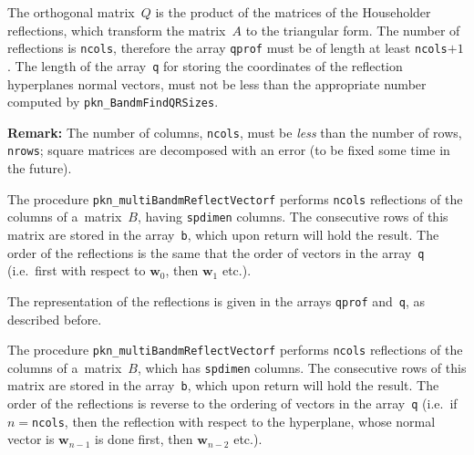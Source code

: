 The orthogonal matrix~$Q$ is the product of the matrices of the Householder
reflections, which transform the matrix~$A$ to the triangular form.
The number of reflections is \texttt{ncols}, therefore the array
\texttt{qprof} must be of length at least \texttt{ncols}$+1$. The length
of the array~\texttt{q} for storing the coordinates of the reflection
hyperplanes normal vectors, must not be less than the appropriate number
computed by \texttt{pkn\_BandmFindQRSizes}.

\vspace{\medskipamount}
\noindent
\textbf{Remark:} The number of columns, \texttt{ncols}, must be \emph{less}
than the number of rows, \texttt{nrows}; square matrices are decomposed
with an error (to be fixed some time in the future).

\vspace{\bigskipamount}
The procedure \texttt{pkn\_multiBandmReflectVectorf} performs \texttt{ncols}
reflections of the columns of a~matrix~$B$, having \texttt{spdimen} columns.
The consecutive rows of this matrix are stored in the array~\texttt{b},
which upon return will hold the result. The order of the reflections
is the same that the order of vectors in the array~\texttt{q}
(i.e.\ first with respect to $\bm{w}_0$, then $\bm{w}_1$ etc.).

The representation of the reflections is given in the arrays
\texttt{qprof} and~\texttt{q}, as described before.

\newpage
The procedure \texttt{pkn\_multiBandmReflectVectorf} performs \texttt{ncols}
reflections of the columns of a~matrix~$B$, which has \texttt{spdimen} columns.
The consecutive rows of this matrix are stored in the array~\texttt{b},
which upon return will hold the result. The order of the reflections
is reverse to the ordering of vectors in the array~\texttt{q}
(i.e.\ if $n={}$\texttt{ncols}, then the reflection with respect to the
hyperplane, whose normal vector is $\bm{w}_{n-1}$ is done first,
then $\bm{w}_{n-2}$ etc.).


